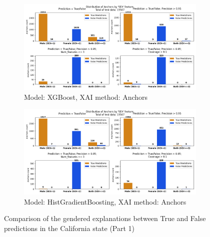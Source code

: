 \begin{figure}[h]
    \centering
    \begin{subfigure}[b]{0.9\textwidth}
        \includegraphics[width=\textwidth]{Images/distribution_folktables/pca_xg_ca_anchors.png}
        \caption{Model: XGBoost, XAI method: Anchors}
        \label{fig:distr_xg_ca_anchors}
    \end{subfigure}
    \hfill
    \begin{subfigure}[b]{0.9\textwidth}
        \includegraphics[width=\textwidth]{Images/distribution_folktables/pca_skrub_ca_anchors.png}
        \caption{Model: HistGradientBoosting, XAI method: Anchors}
        \label{fig:distr_skrub_ca_anchors}
    \end{subfigure}
    \caption{Comparison of the gendered explanations between True and False predictions in the California state (Part 1)}
 \end{figure}

